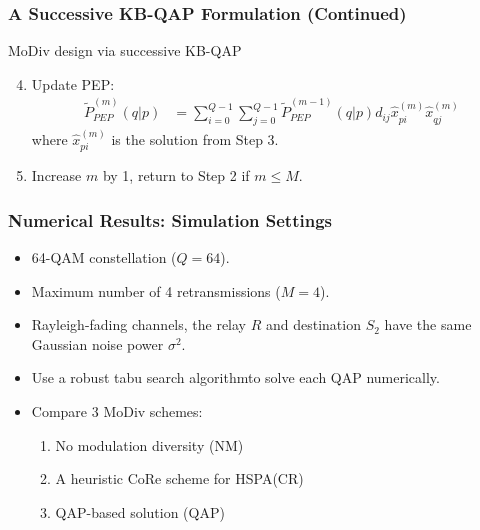 \documentclass{beamer}
\begin{document}
\begin{frame}
  \frametitle{A Successive KB-QAP Formulation (Continued)}
  \begin{block}{MoDiv design via successive KB-QAP}
    \begin{enumerate}[<+->]
      \setcounter{enumi}{3}
      \item Update PEP:
      \begin{align*}
        \tilde{P}_{PEP}^{(m)}(q|p) & = \sum_{i=0}^{Q-1}
        \sum_{j=0}^{Q-1}\tilde{P}_{PEP}^{(m
        - 1)}(q|p)d_{ij}\hat{x}_{pi}^{(m)}\hat{x}_{qj}^{(m)}
      \end{align*}
      where $\hat{x}_{pi}^{(m)}$ is the solution from Step 3.
      \item Increase $m$ by 1, return to Step 2 if $m \leq M$.
    \end{enumerate}
  \end{block}
  \vfill
\end{frame}

\begin{frame}
  \frametitle{Numerical Results: Simulation Settings}
  \begin{itemize}[<+->]
    \item 64-QAM constellation ($Q = 64$).
    \item Maximum number of 4 retransmissions ($M = 4$).
    \item Rayleigh-fading channels, the relay $R$ and destination $S_2$ have the
    same Gaussian noise power $\sigma^2$.
    \item Use a robust tabu search algorithm\footnotemark to solve each QAP
    numerically.
    \item Compare 3 MoDiv schemes:
      \begin{enumerate}
        \item No modulation diversity (NM)
        \item A heuristic CoRe scheme for HSPA\footnotemark (CR)
        \item QAP-based solution (QAP)
      \end{enumerate}
  \end{itemize}
\end{frame}
\end{document}
